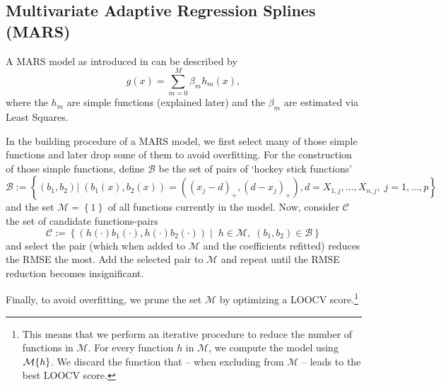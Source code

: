 \subsection{Multivariate Adaptive Regression Splines (MARS)}{\label{sec:corr_model_MARS}
    A MARS model as introduced in \cite{friedmanMultivariateAdaptiveRegression1991} can be described by 
    \begin{equation}
        \label{eq:mars}
        g(x) = \sum_{m=0}^M \beta_m h_m(x),
    \end{equation}
    where the $h_m$ are simple functions (explained later) and the $\beta_m$ are estimated via Least Squares. 
    
    In the building procedure of a MARS model, we first select many of those simple functions and later drop some of them to avoid overfitting. For the construction of those simple functions, define $\mathcal{B}$ be the set of pairs of `hockey stick functions'
    \begin{equation}
        \label{eq:mars_basis_fun}
        \mathcal{B}:=\left\{
            \left(b_1,b_2\right) 
            | \;
            \left(b_1(x),b_2(x)\right) = \left(\left(x_{j}-d\right)_+,\left(d-x_{j}\right)_+\right),
            d =X_{1, j},  \ldots, X_{n, j},\;
            j=1, \ldots, p
        \right\}
    \end{equation}
    and the set $\mathcal{M}=\left\{1\right\}$ of all functions currently in the model. Now, consider $\mathcal{C}$ the set of candidate functions-pairs 
    \begin{equation}
        \label{eq:mars_candidate}
        \mathcal{C}:=\left\{
            \left(h(\cdot)b_1(\cdot),  h(\cdot)b_2(\cdot) \right)
            \;| \;\; h\in\mathcal{M}, \; 
            (b_1,b_2) \in \mathcal{B}
        \right\}
    \end{equation}
    and select the pair (which when added to $\mathcal{M}$ and the coefficients refitted) reduces the RMSE the most. Add the selected pair to $\mathcal{M}$ and repeat until the RMSE reduction becomes insignificant.

    Finally, to avoid overfitting, we prune the set $\mathcal{M}$ by optimizing a LOOCV score.\footnote{This means that we perform an iterative procedure to reduce the number of functions in $\mathcal{M}$. For every function $h$ in $\mathcal{M}$, we compute the model using $\mathcal{M}\\\{h\}$. We discard the function that -- when excluding from $\mathcal{M}$ -- leads to the best LOOCV score.}  

}
